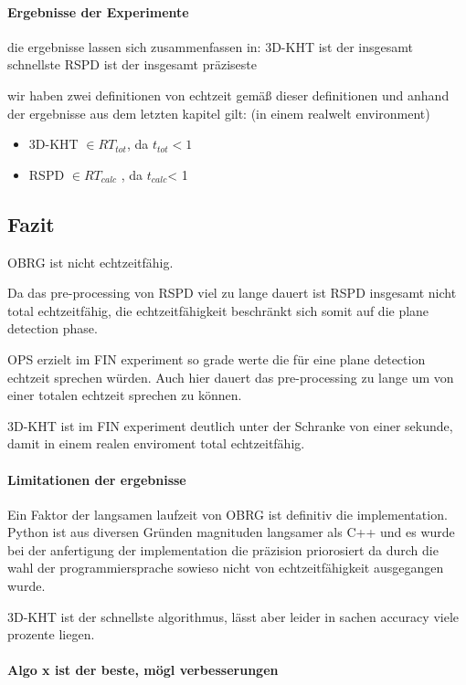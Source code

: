 \documentclass[main.tex]{subfiles}
\begin{document}
\paragraph{Ergebnisse der Experimente }
die ergebnisse lassen sich zusammenfassen in:
3D-KHT ist der insgesamt schnellste
RSPD ist der insgesamt präziseste
 
wir haben zwei definitionen von echtzeit
gemäß dieser definitionen und anhand der ergebnisse aus dem letzten kapitel gilt:
(in einem realwelt environment)
\begin{itemize}
    \item 3D-KHT $\in RT_{tot}$, da $t_{tot} < 1$
    \item RSPD $\in RT_{calc}$ , da $t_{calc}$< 1
\end{itemize}

\subsection{Fazit}

OBRG ist nicht echtzeitfähig.

Da das pre-processing von RSPD viel zu lange dauert ist RSPD insgesamt nicht total echtzeitfähig,
die echtzeitfähigkeit beschränkt sich somit auf die plane detection phase.

OPS erzielt im FIN experiment so grade werte die für eine plane detection echtzeit sprechen würden.
Auch hier dauert das pre-processing zu lange um von einer totalen echtzeit sprechen zu können.

3D-KHT ist im FIN experiment deutlich unter der Schranke von einer sekunde, damit in einem realen 
enviroment total echtzeitfähig. 


\paragraph{Limitationen der ergebnisse}
Ein Faktor der langsamen laufzeit von OBRG ist definitiv die implementation. Python ist aus diversen
Gründen magnituden langsamer als C++ und es wurde bei der anfertigung der implementation die 
präzision priorosiert da durch die wahl der programmiersprache sowieso nicht von echtzeitfähigkeit 
ausgegangen wurde.

3D-KHT ist der schnellste algorithmus, lässt aber leider in sachen accuracy viele prozente liegen.

\paragraph{Algo x ist der beste, mögl verbesserungen}
\end{document}
